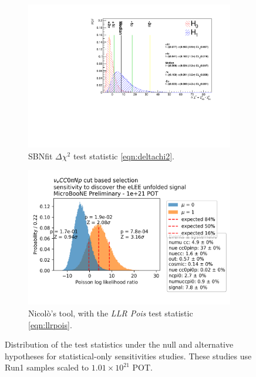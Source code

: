 \documentclass[a4paper]{article}
\begin{document}
\begin{figure}[ht] 
\begin{center}
    \begin{subfigure}[b]{0.48\textwidth}
        \centering
        \includegraphics[width=1.\textwidth]{Sensitivity/SBNfit_Cls_nue_reco_e_genietune_run1_LEE_deltachi_statonly.pdf}
        \caption{SBNfit $\Delta \chi^2$ test statistic \ref{eqn:deltachi2}.}
    \end{subfigure}
        \begin{subfigure}[b]{0.48\textwidth}
        \centering
        \includegraphics[width=1.\textwidth]{Sensitivity/pois_llr_discovery_totalpot_1e+21_nosyst.png}
        \caption{Nicol\`o's tool, with the \emph{LLR Pois} test statistic \ref{eqn:llrpois}.}
    \end{subfigure}
\caption{Distribution of the test statistics under the null and alternative hypotheses for statistical-only sensitivities studies. These studies use Run1 samples scaled to $1.01\times10^{21}$ POT.}
\label{fig:1eNp:box:statonlysensitivity}
\end{center}
\end{figure}
\end{document}
